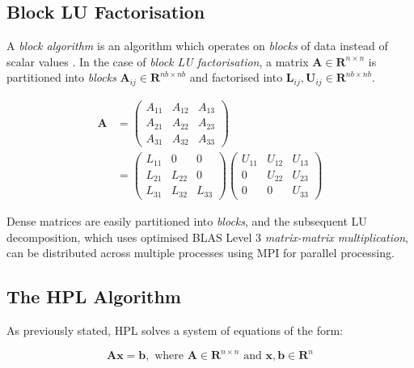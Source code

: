 %
%
\subsection{Block LU Factorisation}

A \emph{block algorithm} is an algorithm which operates on \emph{blocks} of data instead of scalar values \cite{blocklu}. In the case of \emph{block LU factorisation}, a matrix $\mathbf{A} \in \mathbf{R}^{n \times n}$ is partitioned into \emph{blocks} $\mathbf{A}_{ij} \in \mathbf{R}^{nb \times nb}$ and factorised into $\mathbf{L}_{ij}, \mathbf{U}_{ij} \in \mathbf{R}^{nb \times nb}$. 


\begin{align}
\mathbf{A} &= \begin{pmatrix}
A_{11} & A_{12} & A_{13} \\
A_{21} & A_{22} & A_{23} \\
A_{31} & A_{32} & A_{33} 
\end{pmatrix}\\
&= \begin{pmatrix}
L_{11} & 0      & 0 \\
L_{21} & L_{22} & 0 \\
L_{31} & L_{32} & L_{33} 
\end{pmatrix}
\begin{pmatrix}
U_{11} & U_{12} & U_{13} \\
0      & U_{22} & U_{23} \\
0      & 0      & U_{33} 
\end{pmatrix}
\end{align}

Dense matrices are easily partitioned into \emph{blocks}, and the subsequent LU decomposition, which uses optimised BLAS Level 3 \emph{matrix-matrix multiplication}, can be distributed across multiple processes using MPI for parallel processing.


%
%
\subsection{The HPL Algorithm}

As previously stated, HPL solves a system of equations of the form:

\begin{equation}
\mathbf{Ax} = \mathbf{b},\text{ where }\mathbf{A} \in \mathbf{R}^{n\times n}\text{ and }\mathbf{x}, \mathbf{b} \in \mathbf{R}^n
\end{equation} 


